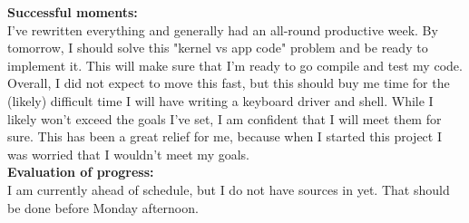 \documentclass[11pt]{article}
\begin{document}
\textbf{Successful moments:}\\
I've rewritten everything and generally had an all-round productive week. By tomorrow, I should solve this "kernel vs app code" problem and be ready to implement it. This will make sure that I'm ready to go compile and test my code. Overall, I did not expect to move this fast, but this should buy me time for the (likely) difficult time I will have writing a keyboard driver and shell. While I likely won't exceed the goals I've set, I am confident that I will meet them for sure. This has been a great relief for me, because when I started this project I was worried that I wouldn't meet my goals.\\
\textbf{Evaluation of progress:}\\
I am currently ahead of schedule, but I do not have sources in yet. That should be done before Monday afternoon.
\end{document}
